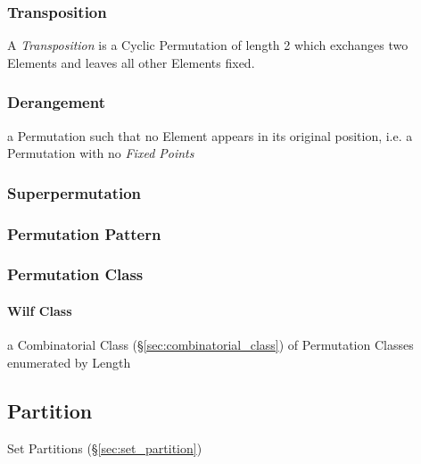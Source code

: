 \subsubsection{Transposition}\label{sec:transposition}

A \emph{Transposition} is a Cyclic Permutation of length 2 which exchanges two
Elements and leaves all other Elements fixed.



\subsubsection{Derangement}\label{sec:derangement}

a Permutation such that no Element appears in its original position, i.e. a
Permutation with no \emph{Fixed Points}



\subsubsection{Superpermutation}\label{sec:superpermutation}

\subsubsection{Permutation Pattern}\label{sec:permutation_pattern}

\subsubsection{Permutation Class}\label{sec:permutation_class}

\paragraph{Wilf Class}\label{sec:wilf_class}\hfill

a Combinatorial Class (\S\ref{sec:combinatorial_class}) of Permutation Classes
enumerated by Length



\subsection{Partition}\label{sec:partition}

Set Partitions (\S\ref{sec:set_partition})

